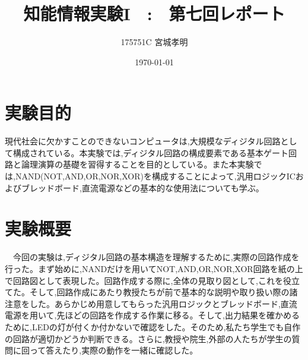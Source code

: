 \documentclass[a4paper,11pt,titlepage]{jarticle}
\title{知能情報実験I　:　第七回レポート}
\author{175751C 宮城孝明}
\date{\today}
\begin{document}
\maketitle
\tableofcontents
\clearpage
\section{実験目的}
 現代社会に欠かすことのできないコンピュータは,大規模なディジタル回路として構成されている。本実験では,ディジタル回路の構成要素である基本ゲート回路と論理演算の基礎を習得することを目的としている。また本実験では,NAND(NOT,AND,OR,NOR,XOR)を構成することによって,汎用ロジックICおよびブレッドボード,直流電源などの基本的な使用法についても学ぶ。\par

\section{実験概要}
　今回の実験は,ディジタル回路の基本構造を理解するために,実際の回路作成を行った。まず始めに,NANDだけを用いてNOT,AND,OR,NOR,XOR回路を紙の上で回路図として表現した。回路作成する際に,全体の見取り図として,これを役立てた。そして,回路作成にあたり教授たちが前で基本的な説明や取り扱い際の諸注意をした。あらかじめ用意してもらった汎用ロジックとブレッドボード,直流電源を用いて,先ほどの回路を作成する作業に移る。そして,出力結果を確かめるために,LEDの灯が付くか付かないで確認をした。そのため,私たち学生でも自作の回路が適切かどうか判断できる。さらに,教授や院生,外部の人たちが学生の質問に回って答えたり,実際の動作を一緒に確認した。\par
\end{document}
